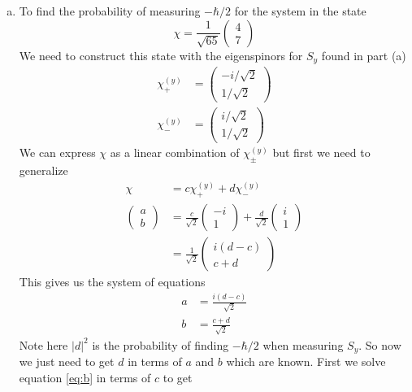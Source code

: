 \documentclass[11pt]{article}
\numberwithin{equation}{section}
\begin{document}
\begin{enumerate}[(a)]
\item
To find the probability of measuring $-\hbar/2$ for the system in the state
$$\chi = \frac{1}{\sqrt{65}}\left(\begin{array}{c}4\\ 7\end{array}\right)$$
We need to construct this state with the eigenspinors for $S_y$ found in part (a)
\begin{align}
\chi^{(y)}_+ &= \left(\begin{array}{c}
                   -i/\sqrt{2}\\
                    1/\sqrt{2}
                 \end{array}\right)\\
\chi^{(y)}_- &= \left(\begin{array}{c}
                    i/\sqrt{2}\\
                    1/\sqrt{2}
                 \end{array}\right)
\end{align}
We can express $\chi$ as a linear combination of $\chi^{(y)}_{\pm}$ but first we need to generalize
\begin{align*}
\chi &= c\chi^{(y)}_{+} + d\chi^{(y)}_{-}\\
\left(\begin{array}{c}
   a\\
   b
 \end{array}\right) &=
\frac{c}{\sqrt{2}}\left(\begin{array}{c}
   -i\\
    1
 \end{array}\right) + 
\frac{d}{\sqrt{2}}\left(\begin{array}{c}
   i\\
    1
 \end{array}\right)\\
&= \frac{1}{\sqrt{2}}\left(\begin{array}{c}
   i(d-c)\\
    c+d
 \end{array}\right)
\end{align*}
This gives us the system of equations
\begin{align}
a &= \frac{i(d-c)}{\sqrt{2}} \label{eq:a}\\
b &= \frac{c+d}{\sqrt{2}} \label{eq:b}
\end{align}
Note here $|d|^2$ is the probability of finding $-\hbar/2$ when measuring $S_y$. So now we just need to get $d$ in terms of $a$ and $b$ which are known. First we solve equation \ref{eq:b} in terms of $c$ to get

\end{enumerate}
\end{document}
